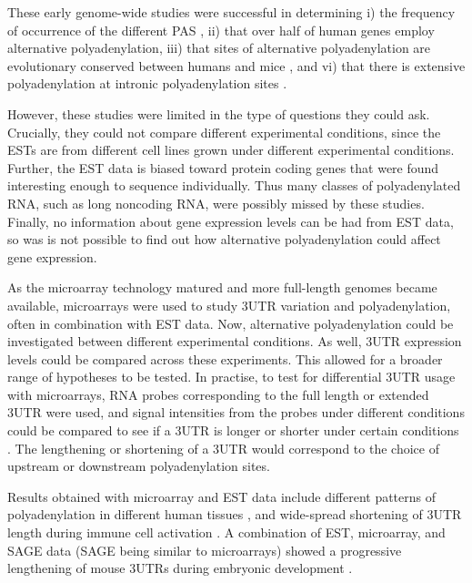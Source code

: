These early genome-wide studies were successful in determining i) the frequency
of occurrence of the different PAS \cite{beaudoing_patterns_2000}, ii) that
over half of human genes employ alternative polyadenylation, iii) that sites of
alternative polyadenylation are evolutionary conserved between humans and mice
\cite{tian_large-scale_2005}, and vi) that there is extensive polyadenylation
at intronic polyadenylation sites \cite{tian_widespread_2007}.

However, these studies were limited in the type of questions they could ask.
Crucially, they could not compare different experimental conditions, since the
ESTs are from different cell lines grown under different experimental
conditions. Further, the EST data is biased toward protein coding genes that
were found interesting enough to sequence individually. Thus many classes of
polyadenylated RNA, such as long noncoding RNA, were possibly missed by these
studies. Finally, no information about gene expression levels can be had from
EST data, so was is not possible to find out how alternative polyadenylation
could affect gene expression.

As the microarray technology matured and more full-length genomes became
available, microarrays were used to study 3\p UTR variation and
polyadenylation, often in combination with EST data. Now, alternative
polyadenylation could be investigated between different experimental
conditions. As well, 3UTR expression levels could be compared across these
experiments. This allowed for a broader range of hypotheses to be tested. In
practise, to test for differential 3UTR usage with microarrays, RNA probes
corresponding to the full length or extended 3UTR were used, and signal
intensities from the probes under different conditions could be compared to see
if a 3UTR is longer or shorter under certain conditions
\cite{sandberg_proliferating_2008, ji_progressive_2009}. The lengthening or
shortening of a 3\p UTR would correspond to the choice of upstream or
downstream polyadenylation sites.

Results obtained with microarray and EST data include different patterns of
polyadenylation in different human tissues \cite{zhang_biased_2005}, and
wide-spread shortening of 3\p UTR length during immune cell activation
\cite{sandberg_proliferating_2008}. A combination of EST, microarray, and SAGE
data (SAGE being similar to microarrays) showed a progressive lengthening of
mouse 3\p UTRs during embryonic development \cite{ji_progressive_2009}.

